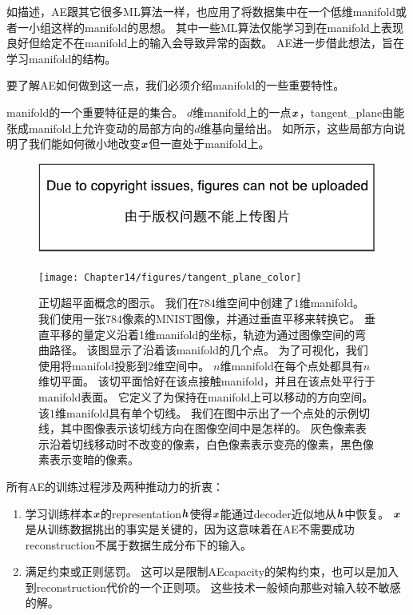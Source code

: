 如描述，\gls{AE}跟其它很多\gls{ML}算法一样，也应用了将数据集中在一个低维\gls{manifold}或者一小组这样的\gls{manifold}的思想。
其中一些\gls{ML}算法仅能学习到在\gls{manifold}上表现良好但给定不在\gls{manifold}上的输入会导致异常的函数。
\gls{AE}进一步借此想法，旨在学习\gls{manifold}的结构。


要了解\gls{AE}如何做到这一点，我们必须介绍\gls{manifold}的一些重要特性。


\gls{manifold}的一个重要特征是的集合。
$d$维\gls{manifold}上的一点$\boldsymbol{\mathit{x}}$，\gls{tangent_plane}由能张成\gls{manifold}上允许变动的局部方向的$d$维基向量给出。
如所示，这些局部方向说明了我们能如何微小地改变$\boldsymbol{\mathit{x}}$但一直处于\gls{manifold}上。

\begin{figure}[!htb]
\ifOpenSource
\centerline{\includegraphics{figure.pdf}}
\else
\centerline{\texttt{[image: Chapter14/figures/tangent\_plane\_color]}}
\fi
\caption{正切超平面概念的图示。
我们在$784$维空间中创建了$1$维\gls{manifold}。
我们使用一张784像素的MNIST图像，并通过垂直平移来转换它。
垂直平移的量定义沿着1维\gls{manifold}的坐标，轨迹为通过图像空间的弯曲路径。
该图显示了沿着该\gls{manifold}的几个点。
为了可视化，我们使用将\gls{manifold}投影到$2$维空间中。
$n$维\gls{manifold}在每个点处都具有$n$维切平面。
该切平面恰好在该点接触\gls{manifold}，并且在该点处平行于\gls{manifold}表面。
它定义了为保持在\gls{manifold}上可以移动的方向空间。
该$1$维\gls{manifold}具有单个切线。
我们在图中示出了一个点处的示例切线，其中图像表示该切线方向在图像空间中是怎样的。
灰色像素表示沿着切线移动时不改变的像素，白色像素表示变亮的像素，黑色像素表示变暗的像素。
}
\label{fig:chap14_tangent_plane_color}
\end{figure}


所有\gls{AE}的训练过程涉及两种推动力的折衷：
\begin{enumerate}
 \item 学习训练样本$\boldsymbol{\mathit{x}}$的\gls{representation}$\boldsymbol{\mathit{h}}$使得$\boldsymbol{\mathit{x}}$能通过\gls{decoder}近似地从$\boldsymbol{\mathit{h}}$中恢复。
$\boldsymbol{\mathit{x}}$是从训练数据挑出的事实是关键的，因为这意味着在\gls{AE}不需要成功\gls{reconstruction}不属于数据生成分布下的输入。
 \item 满足约束或正则惩罚。
这可以是限制\gls{AE}\gls{capacity}的架构约束，也可以是加入到\gls{reconstruction}代价的一个正则项。
这些技术一般倾向那些对输入较不敏感的解。
\end{enumerate}

